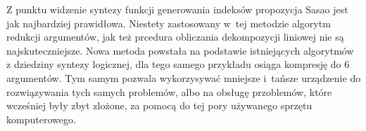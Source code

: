 Z punktu widzenie syntezy funkcji generowania indeksów propozycja Sasao jest jak najbardziej prawidłowa.
Niestety zastosowany w~tej metodzie algorytm redukcji argumentów,
jak też prcedura obliczania dekompozycji liniowej nie są najskuteczniejsze.
Nowa metoda powstała na podstawie istniejących algorytmów z dziedziny syntezy logicznej,
dla tego samego przykładu osiąga kompresję do 6 argumentów.
Tym samym pozwala wykorzysywać mniejsze i~tańsze urządzenie do rozwiązywania tych samych problemów,
albo na obsługę przoblemów, które wcześniej były zbyt zlożone,
za pomocą do tej pory używanego sprzętu komputerowego.






